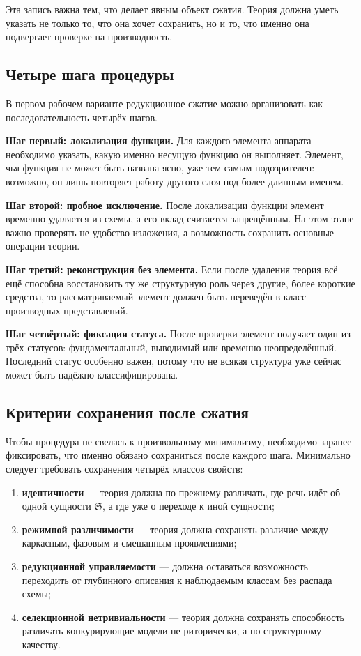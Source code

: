 \documentclass[12pt,a4paper]{article}
\begin{document}
Эта запись важна тем, что делает явным объект сжатия. Теория должна уметь указать не только то, что она хочет сохранить, но и то, что именно она подвергает проверке на производность.

\subsection{Четыре шага процедуры}

В первом рабочем варианте редукционное сжатие можно организовать как последовательность четырёх шагов.

\textbf{Шаг первый: локализация функции.} Для каждого элемента аппарата необходимо указать, какую именно несущую функцию он выполняет. Элемент, чья функция не может быть названа ясно, уже тем самым подозрителен: возможно, он лишь повторяет работу другого слоя под более длинным именем.

\textbf{Шаг второй: пробное исключение.} После локализации функции элемент временно удаляется из схемы, а его вклад считается запрещённым. На этом этапе важно проверять не удобство изложения, а возможность сохранить основные операции теории.

\textbf{Шаг третий: реконструкция без элемента.} Если после удаления теория всё ещё способна восстановить ту же структурную роль через другие, более короткие средства, то рассматриваемый элемент должен быть переведён в класс производных представлений.

\textbf{Шаг четвёртый: фиксация статуса.} После проверки элемент получает один из трёх статусов: фундаментальный, выводимый или временно неопределённый. Последний статус особенно важен, потому что не всякая структура уже сейчас может быть надёжно классифицирована.

\subsection{Критерии сохранения после сжатия}

Чтобы процедура не свелась к произвольному минимализму, необходимо заранее фиксировать, что именно обязано сохраниться после каждого шага. Минимально следует требовать сохранения четырёх классов свойств:
\begin{enumerate}
    \item \textbf{идентичности} --- теория должна по-прежнему различать, где речь идёт об одной сущности \(\mathfrak{S}\), а где уже о переходе к иной сущности;
    \item \textbf{режимной различимости} --- теория должна сохранять различие между каркасным, фазовым и смешанным проявлениями;
    \item \textbf{редукционной управляемости} --- должна оставаться возможность переходить от глубинного описания к наблюдаемым классам без распада схемы;
    \item \textbf{селекционной нетривиальности} --- теория должна сохранять способность различать конкурирующие модели не риторически, а по структурному качеству.
\end{enumerate}
\end{document}
